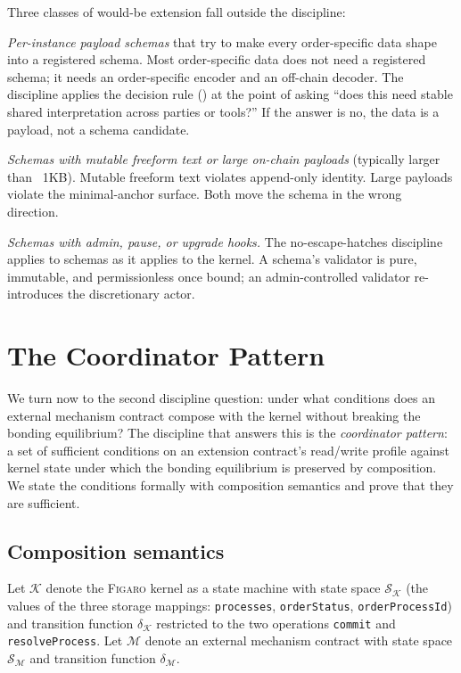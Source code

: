 \documentclass[11pt,a4paper]{article}
\theoremstyle{definition}
\theoremstyle{remark}
\newcommand{\figaro}{\textsc{Figaro}}
\begin{document}
Three classes of would-be extension fall outside the discipline:

\emph{Per-instance payload schemas} that try to make every
order-specific data shape into a registered schema. Most
order-specific data does not need a registered schema; it needs an
order-specific encoder and an off-chain decoder. The discipline
applies the decision rule () at the
point of asking ``does this need stable shared interpretation
across parties or tools?'' If the answer is no, the data is a
payload, not a schema candidate.

\emph{Schemas with mutable freeform text or large on-chain
payloads} (typically larger than ~1KB). Mutable freeform text
violates append-only identity. Large payloads violate the
minimal-anchor surface. Both move the schema in the wrong direction.

\emph{Schemas with admin, pause, or upgrade hooks.} The
no-escape-hatches discipline applies to schemas as it applies to
the kernel. A schema's validator is pure, immutable, and
permissionless once bound; an admin-controlled validator
re-introduces the discretionary actor.

\section{The Coordinator Pattern}
\label{sec:coordinator}

We turn now to the second discipline question: under what conditions
does an external mechanism contract compose with the kernel without
breaking the bonding equilibrium? The discipline that answers this
is the \emph{coordinator pattern}: a set of sufficient conditions on
an extension contract's read/write profile against kernel state
under which the bonding equilibrium is preserved by composition. We
state the conditions formally with composition semantics and prove
that they are sufficient.

\subsection{Composition semantics}

Let $\mathcal{K}$ denote the \figaro{} kernel as a state machine with
state space $\mathcal{S}_{\mathcal{K}}$ (the values of the three
storage mappings: \texttt{processes}, \texttt{orderStatus},
\texttt{orderProcessId}) and transition function $\delta_{\mathcal{K}}$
restricted to the two operations \texttt{commit} and
\texttt{resolveProcess}. Let $\mathcal{M}$ denote an external
mechanism contract with state space $\mathcal{S}_{\mathcal{M}}$ and
transition function $\delta_{\mathcal{M}}$.
\end{document}
